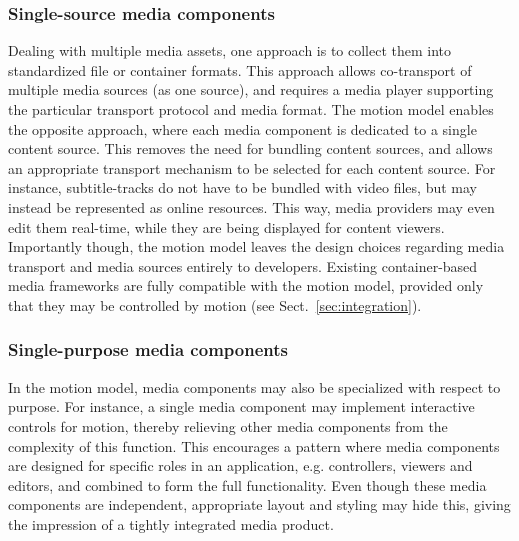 \subsubsection{Single-source media components}

Dealing with multiple media assets, one approach is to collect them into
standardized file or container formats. This approach allows co-transport of
multiple media sources (as one source), and requires a media player supporting
the particular transport protocol and media format. The motion model enables
the opposite approach, where each media component is dedicated to a single
content source. This removes the need for bundling content sources, and allows
an appropriate transport mechanism to be selected for each content source. For
instance, subtitle-tracks do not have to be bundled with video files, but may
instead be represented as online resources. This way, media providers may even
edit them real-time, while they are being displayed for content viewers.
Importantly though, the motion model leaves the design choices regarding media
transport and media sources entirely to developers. Existing container-based
media frameworks are fully compatible with the motion model, provided only
that they may be controlled by motion (see Sect.~\ref{sec:integration}).

\subsubsection{Single-purpose media components}

In the motion model, media components may also be specialized with respect to
purpose. For instance, a single media component may implement interactive
controls for motion, thereby relieving other media components from the
complexity of this function. This encourages a pattern where media components
are designed for specific roles in an application, e.g. controllers, viewers
and editors, and combined to form the full functionality. Even though these
media components are independent, appropriate layout and styling may hide
this, giving the impression of a tightly integrated media product.

